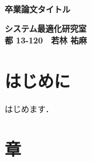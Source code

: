 \documentclass[a4paper,12pt,fleqn]{jarticle}
\begin{document}
\pagestyle{empty}
\begin{center}
 \ \\
 \vspace{8cm}
 \begin{Large}
   {\bf 卒業論文タイトル}\\
 \end{Large}
 \vspace{2cm}
 \begin{large}
  {\bf システム最適化研究室} \\
  {\bf 都 13-120　若林 祐麻}
 \end{large}
\end{center}


\newpage
\pagestyle{plain}
\tableofcontents

\newpage
{}
\section{はじめに}
はじめます．

\newpage
\section{章}
\end{document}
